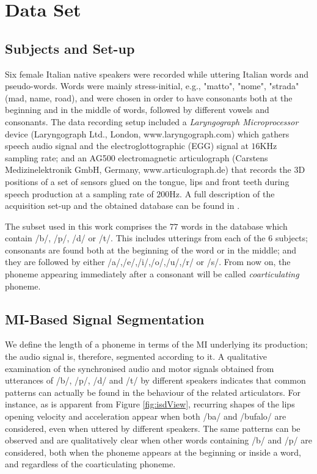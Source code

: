 \section{Data Set}
\label{sec:dataset}

\subsection{Subjects and Set-up}
\label{subsec:setup}

Six female Italian native speakers were recorded while uttering
Italian words and pseudo-words. Words were mainly stress-initial, e.g.,
"matto", "nome", "strada" (mad, name, road), and were chosen in order
to have consonants both at the beginning and in the middle of
words, followed by different vowels and consonants.
The data recording setup included a \emph{Laryngograph Microprocessor}
device (Laryngograph Ltd., London, www.laryngograph.com) which gathers speech audio
signal and the electroglottographic (EGG) signal at $16$KHz sampling
rate; and an AG500 electromagnetic articulograph (Carstens Medizinelektronik
GmbH, Germany, www.articulograph.de) that records the
3D positions of a set of sensors glued on the tongue, lips and front teeth
during speech production at a sampling rate of $200$Hz. A full description of the 
acquisition set-up and the obtained database can be found in \cite{tavella}.

The subset used in this work comprises the $77$ words in the database
which contain /b/, /p/, /d/ or /t/. This includes utterings from each of the
$6$ subjects; consonants are found both at the beginning of the word or
in the middle; and they are followed by either /a/,/e/,/i/,/o/,/u/,/r/ or /s/.
From now on, the phoneme appearing immediately after a consonant will be called
\emph{coarticulating} phoneme.

\subsection{MI-Based Signal Segmentation}
\label{subsec:segm}

We define the length of a phoneme in terms of the MI underlying its production;
the audio signal is, therefore, segmented according to it.
A qualitative examination of the synchronised audio and motor
signals obtained from utterances of /b/, /p/, /d/ and /t/
by different speakers indicates that common patterns can
actually be found in the behaviour of the related articulators.
For instance, as is apparent from Figure \ref{fig:isdView}, 
recurring shapes of the lips opening velocity and acceleration appear
when both /ba/ and /bufalo/ are considered, even when uttered by different
speakers. The same patterns can be observed and are qualitatively clear when other
words containing /b/ and /p/ are considered, both when the phoneme appears at the
beginning or inside a word, and regardless of the coarticulating phoneme.

